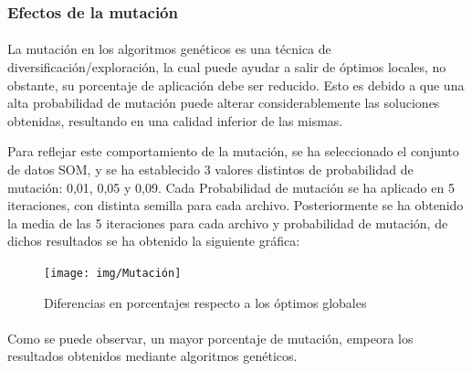 	\subsubsection{Efectos de la mutación}
	
	\paragraph{} La mutación en los algoritmos genéticos es una técnica de diversificación/exploración, la cual puede ayudar a salir de óptimos locales, no obstante, su porcentaje de aplicación debe ser reducido. Esto es debido a que una alta probabilidad de mutación puede alterar considerablemente las soluciones obtenidas, resultando en una calidad inferior de las mismas.
	
	Para reflejar este comportamiento de la mutación, se ha seleccionado el conjunto de datos SOM, y se ha establecido 3 valores distintos de probabilidad de mutación: 0,01, 0,05 y 0,09. Cada Probabilidad de mutación se ha aplicado en 5 iteraciones, con distinta semilla para cada archivo. Posteriormente se ha obtenido la media de las 5 iteraciones para cada archivo y probabilidad de mutación, de dichos resultados se ha obtenido la siguiente gráfica:
	
	\begin{figure}[H]
		
		\centering
		\texttt{[image: img/Mutación]}
		\caption{Diferencias en porcentajes respecto a los óptimos globales}
		
	\end{figure}
	
	\paragraph{}Como se puede observar, un mayor porcentaje de mutación, empeora los resultados obtenidos mediante algoritmos genéticos.
	
